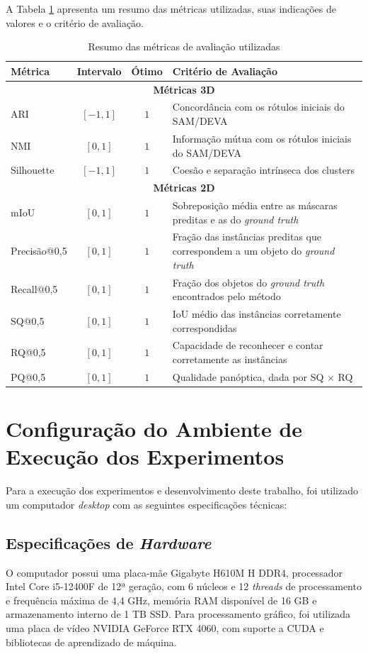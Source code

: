 A Tabela \ref{tab:metrics_summary} apresenta um resumo das métricas utilizadas, suas indicações de valores e o critério de avaliação.

\begin{table}[H]
\centering
\caption{Resumo das métricas de avaliação utilizadas}
\label{tab:metrics_summary}
\begin{tabular}{|l|c|c|p{6cm}|}
\hline
\textbf{Métrica} & \textbf{Intervalo} & \textbf{Ótimo} & \textbf{Critério de Avaliação} \\
\hline
\multicolumn{4}{|c|}{\textbf{Métricas 3D}} \\
\hline
ARI & $[-1, 1]$ & $1$ & Concordância com os rótulos iniciais do SAM/DEVA \\
NMI & $[0, 1]$ & $1$ & Informação mútua com os rótulos iniciais do SAM/DEVA \\
Silhouette & $[-1, 1]$ & $1$ & Coesão e separação intrínseca dos clusters \\
\hline
\multicolumn{4}{|c|}{\textbf{Métricas 2D}} \\
\hline
mIoU & $[0, 1]$ & $1$ & Sobreposição média entre as máscaras preditas e as do \textit{ground truth} \\
Precisão@0,5 & $[0, 1]$ & $1$ & Fração das instâncias preditas que correspondem a um objeto do \textit{ground truth} \\
Recall@0,5 & $[0, 1]$ & $1$ & Fração dos objetos do \textit{ground truth} encontrados pelo método \\
SQ@0,5 & $[0, 1]$ & $1$ & IoU médio das instâncias corretamente correspondidas \\
RQ@0,5 & $[0, 1]$ & $1$ & Capacidade de reconhecer e contar corretamente as instâncias \\
PQ@0,5 & $[0, 1]$ & $1$ & Qualidade panóptica, dada por SQ $\times$ RQ \\
\hline
\end{tabular}
\end{table}


\section{Configuração do Ambiente de Execução dos Experimentos}
Para a execução dos experimentos e desenvolvimento deste trabalho, foi utilizado um computador \textit{desktop} com as seguintes especificações técnicas:

\subsection{Especificações de \textit{Hardware}}
O computador possui uma placa-mãe Gigabyte H610M H DDR4, processador Intel Core i5-12400F de 12ª geração, com 6 núcleos e 12 \textit{threads} de processamento e frequência máxima de 4,4 GHz, memória RAM disponível de 16 GB e armazenamento interno de 1 TB SSD. Para processamento gráfico, foi utilizada uma placa de vídeo NVIDIA GeForce RTX 4060, com suporte a CUDA e bibliotecas de aprendizado de máquina.

